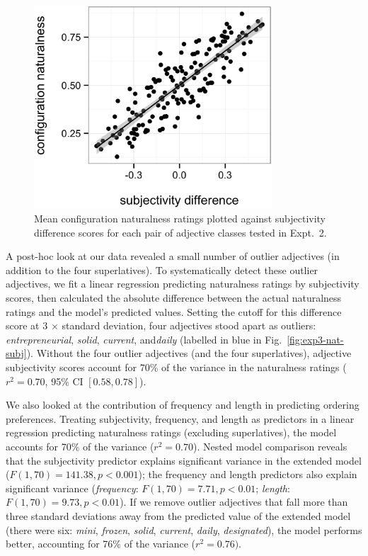\documentclass[12pt]{article}
\newcommand{\ndg}[1]{\textcolor{Green}{[ndg: #1]}}
\begin{document}
\begin{figure}
	\centering\includegraphics[width=3.5in]{plots/naturalness-subjectivity_class-difference_no-sup.eps}
	\caption{Mean configuration naturalness ratings plotted against subjectivity difference scores for each pair of adjective classes tested in Expt.~2. 
		}\label{fig:exp3-nat-subj-diff}
\end{figure}

A post-hoc look at our data revealed a small number of outlier adjectives (in addition to the four superlatives). To systematically detect these outlier adjectives, we fit a linear regression predicting naturalness ratings by subjectivity scores, then calculated the absolute difference between the actual naturalness ratings and the model's predicted values. Setting the cutoff for this difference score at 3 $\times$ standard deviation, four adjectives stood apart as outliers: ​\emph{entrepreneurial}, ​\emph{solid}, ​\emph{current}, and ​\emph{daily} (labelled in blue in Fig.~\ref{fig:exp3-nat-subj}). Without the four outlier adjectives (and the four superlatives), adjective subjectivity scores account for 70\% of the variance in the naturalness ratings ($r^2=0.70$, 95\% CI $[0.58,  0.78]$).

We also looked at the contribution of frequency and length in predicting ordering preferences. Treating subjectivity, frequency, and length as predictors in a linear regression predicting naturalness ratings (excluding superlatives), the model accounts for 70\% of the variance ($r^{2}=0.70$). {Nested model comparison reveals that the subjectivity predictor explains significant variance in the extended model ($F(1,70) = 141.38, p < 0.001$); the frequency and length predictors also explain significant variance (\emph{frequency}: $F(1,70) = 7.71, p < 0.01$; \emph{length}: $F(1,70) = 9.73, p < 0.01$).}
If we remove outlier adjectives that fall more than three standard deviations away from the predicted value of the extended model (there were six: \emph{mini}, \emph{frozen}, \emph{solid}, \emph{current}, \emph{daily}, \emph{designated}), the model performs better, accounting for 76\% of the variance ($r^{2}=0.76)$.
\end{document}
